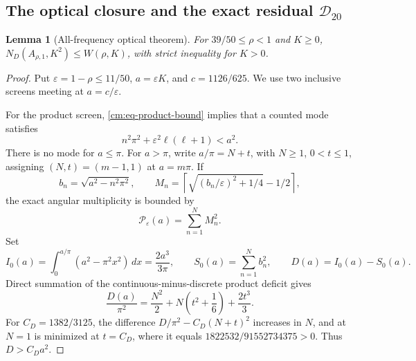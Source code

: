 \documentclass[11pt]{article}
\numberwithin{equation}{section}
\newtheorem{lemma}[theorem]{Lemma}
\theoremstyle{definition}
\theoremstyle{remark}
\begin{document}
\subsection{The optical closure and the exact residual
\texorpdfstring{\(\mathcal D_{20}\)}{D20}}

\begin{lemma}[All-frequency optical theorem]
\label{cm:lem-optical}
For \(39/50\leq\rho<1\) and \(K\geq0\),
\(N_D(A_{\rho,1},K^2)\leq W(\rho,K)\), with strict inequality for
\(K>0\).
\end{lemma}

\begin{proof}
Put \(\varepsilon=1-\rho\leq11/50\),
\(a=\varepsilon K\), and \(c=1126/625\).  We use two inclusive screens
meeting at \(a=c/\varepsilon\).

For the product screen, \eqref{cm:eq-product-bound} implies that a counted
mode satisfies
\[
 n^2\pi^2+\varepsilon^2\ell(\ell+1)<a^2.
\]
There is no mode for \(a\leq\pi\).  For \(a>\pi\), write
\(a/\pi=N+t\), with \(N\geq1\), \(0<t\leq1\), assigning
\((N,t)=(m-1,1)\) at \(a=m\pi\).  If
\[
 b_n=\sqrt{a^2-n^2\pi^2},\qquad
 M_n=\left\lceil\sqrt{(b_n/\varepsilon)^2+1/4}-1/2\right\rceil,
\]
the exact angular multiplicity is bounded by
\[
 \mathcal P_\varepsilon(a)=\sum_{n=1}^N M_n^2.
\]
Set
\[
 I_0(a)=\int_0^{a/\pi}(a^2-\pi^2x^2)\,dx
       =\frac{2a^3}{3\pi},
 \qquad
 S_0(a)=\sum_{n=1}^N b_n^2,
 \qquad D(a)=I_0(a)-S_0(a).
\]
Direct summation of the continuous-minus-discrete product deficit gives
\begin{equation}
 \frac{D(a)}{\pi^2}=\frac{N^2}{2}
 +N\left(t^2+\frac16\right)+\frac{2t^3}{3}.
 \label{cm:eq-optical-product-deficit}
\end{equation}
For \(C_D=1382/3125\), the difference
\(D/\pi^2-C_D(N+t)^2\) increases in \(N\), and at \(N=1\) is minimized
at \(t=C_D\), where it equals
\(1822532/91552734375>0\).  Thus \(D>C_Da^2\).


\end{proof}
\end{document}

